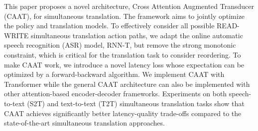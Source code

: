This paper proposes a novel architecture, Cross Attention Augmented Transducer (CAAT), for simultaneous translation. The framework aims to jointly optimize the policy and translation models. To effectively consider all possible READ-WRITE simultaneous translation action paths, we adapt the online automatic speech recognition (ASR) model, RNN-T, but remove the strong monotonic constraint, which is critical for the translation task to consider reordering. To make CAAT work, we introduce a novel latency loss whose expectation can be optimized by a forward-backward algorithm. We implement CAAT with Transformer while the general CAAT architecture can also be implemented with other attention-based encoder-decoder frameworks. Experiments on both speech-to-text (S2T) and text-to-text (T2T) simultaneous translation tasks show that CAAT achieves significantly better latency-quality trade-offs compared to the state-of-the-art simultaneous translation approaches.
